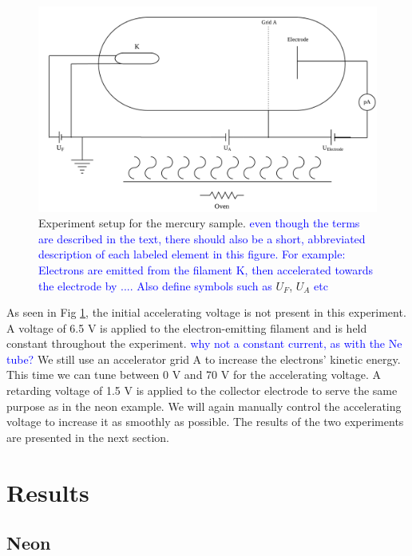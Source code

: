 \documentclass[prb,preprint]{revtex4-1}
\begin{document}
\begin{figure}
    \centering
    \includegraphics[width=\textwidth]{fighg.png}
    \caption{Experiment setup for the mercury sample. 
    \textcolor{blue}{even though the terms are described in the text, there should also be a short, abbreviated description of each labeled element in this figure. For example: Electrons are emitted from the filament K, then accelerated towards the electrode by .... Also define symbols such as }
    $U_F$, $U_A$ 
    \textcolor{blue}{etc}}
    \label{fighg}
    \end{figure}

As seen in Fig \ref{fighg}, the initial accelerating voltage is not present in this experiment. A voltage of 6.5 V is applied to the electron-emitting filament and is held constant throughout the experiment. \textcolor{blue}{why not a constant current, as with the Ne tube?} We still use an accelerator grid A to increase the electrons' kinetic energy. This time we can tune between 0 V and 70 V for the accelerating voltage. A retarding voltage of 1.5 V is applied to the collector electrode to serve the same purpose as in the neon example. We will again manually control the accelerating voltage to increase it as smoothly as possible. The results of the two experiments are presented in the next section.


\section{Results}

\subsection{Neon}
\end{document}
